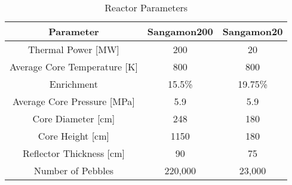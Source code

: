 \begin{table}[h!]
\centering
\begin{tabular}{ c  c  c }
\hline
Parameter & Sangamon200 & Sangamon20 \\
\hline
Thermal Power [MW] & 200 & 20 \\
Average Core Temperature [K] & 800 & 800 \\
Enrichment & 15.5\% & 19.75\% \\
Average Core Pressure [MPa] & 5.9 & 5.9 \\
Core Diameter [cm] & 248 & 180 \\
Core Height [cm] & 1150 & 180 \\
Reflector Thickness [cm] & 90 & 75 \\
Number of Pebbles & 220,000 & 23,000 \\
\hline
\end{tabular}
\caption{Reactor Parameters}
\label{table:params1}
\end{table}